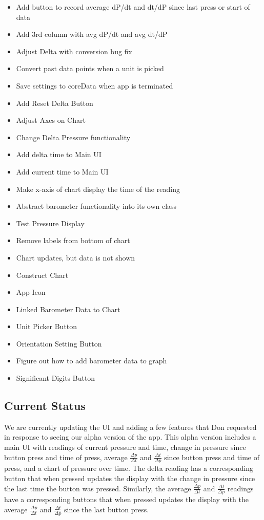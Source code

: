 \documentclass[onecolumn, draftclsnofoot,10pt, compsoc]{IEEEtran}
\begin{document}
        \begin{itemize}
        \item Add button to record average dP/dt and dt/dP since last press or start of data
        \item Add 3rd column with avg dP/dt and avg dt/dP
        \item Adjust Delta with conversion bug fix
        \item Convert past data points when a unit is picked
        \item Save settings to coreData when app is terminated
        \item Add Reset Delta Button
        \item Adjust Axes on Chart
        \item Change Delta Pressure functionality
        \item Add delta time to Main UI
        \item Add current time to Main UI
        \item Make x-axis of chart display the time of the reading
        \item Abstract barometer functionality into its own class
        \item Test Pressure Display
        \item Remove labels from bottom of chart
        \item Chart updates, but data is not shown
        \item Construct Chart
        \item App Icon
        \item Linked Barometer Data to Chart
        \item Unit Picker Button
        \item Orientation Setting Button
        \item Figure out how to add barometer data to graph
        \item Significant Digits Button
        \end{itemize}

    \subsection{Current Status}
        We are currently updating the UI and adding a few features that Don requested in response to seeing our alpha version of the app.
        This alpha version includes a main UI with readings of current pressure and time, change in pressure since button press and time of press, average $\frac{\Delta p}{\Delta t}$ and $\frac{\Delta t}{\Delta p}$ since button press and time of press, and a chart of pressure over time.
        The delta reading has a corresponding button that when pressed updates the display with the change in pressure since the last time the button was pressed.
        Similarly, the average $\frac{\Delta p}{\Delta t}$ and $\frac{\Delta t}{\Delta p}$ readings have a corresponding buttons that when pressed updates the display with the average $\frac{\Delta p}{\Delta t}$ and $\frac{\Delta t}{\Delta p}$ since the last button press.
\end{document}
